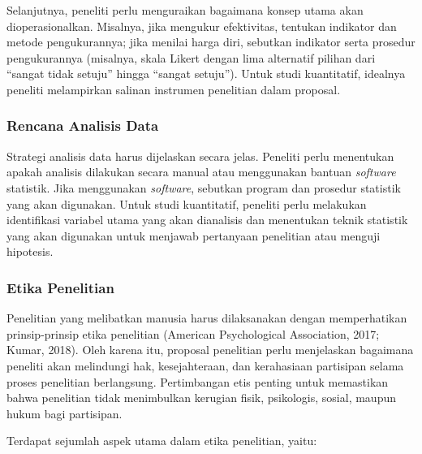 \documentclass[
  indonesian,
  letterpaper,
  DIV=11,
  numbers=noendperiod]{scrreprt}
\begin{document}
Selanjutnya, peneliti perlu menguraikan bagaimana konsep utama akan
dioperasionalkan. Misalnya, jika mengukur efektivitas, tentukan
indikator dan metode pengukurannya; jika menilai harga diri, sebutkan
indikator serta prosedur pengukurannya (misalnya, skala Likert dengan
lima alternatif pilihan dari ``sangat tidak setuju'' hingga ``sangat
setuju''). Untuk studi kuantitatif, idealnya peneliti melampirkan
salinan instrumen penelitian dalam proposal.

\subsubsection{Rencana Analisis Data}\label{rencana-analisis-data}

Strategi analisis data harus dijelaskan secara jelas. Peneliti perlu
menentukan apakah analisis dilakukan secara manual atau menggunakan
bantuan \emph{software} statistik. Jika menggunakan \emph{software},
sebutkan program dan prosedur statistik yang akan digunakan. Untuk studi
kuantitatif, peneliti perlu melakukan identifikasi variabel utama yang
akan dianalisis dan menentukan teknik statistik yang akan digunakan
untuk menjawab pertanyaan penelitian atau menguji hipotesis.

\subsubsection{Etika Penelitian}\label{etika-penelitian}

Penelitian yang melibatkan manusia harus dilaksanakan dengan
memperhatikan prinsip-prinsip etika penelitian (American Psychological
Association, 2017; Kumar, 2018). Oleh karena itu, proposal penelitian
perlu menjelaskan bagaimana peneliti akan melindungi hak, kesejahteraan,
dan kerahasiaan partisipan selama proses penelitian berlangsung.
Pertimbangan etis penting untuk memastikan bahwa penelitian tidak
menimbulkan kerugian fisik, psikologis, sosial, maupun hukum bagi
partisipan.

Terdapat sejumlah aspek utama dalam etika penelitian, yaitu:
\end{document}
